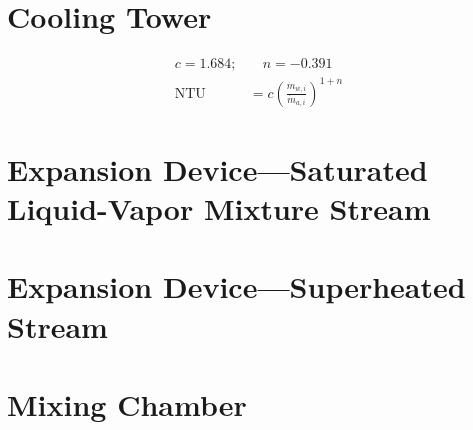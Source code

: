 \section{Cooling Tower} \label{sec:CoolingTower}
\begin{align*}
  c = 1.684; &\quad n = - 0.391 \\
  \text{NTU} &= c\left(\frac{\dot{m}_{w,i}}{\dot{m}_{a,i}}\right)^{1 + n}
\end{align*}

\section{Expansion Device---Saturated Liquid-Vapor Mixture Stream} \label{sec:ExpandMain}

\section{Expansion Device---Superheated Stream} \label{sec:ExpandSHV}

\section{Mixing Chamber} \label{sec:Mixing}

